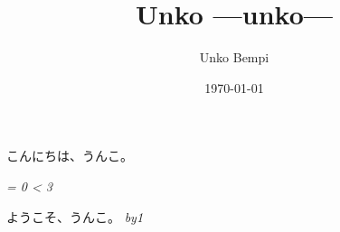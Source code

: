 \documentclass{ltjsarticle}
\author{Unko Bempi}
\date{\today}
\title{Unko ---unko---}
\def\myfor#1{
    \it = 0 \loop\ifnum\it < #1

    ようこそ、うんこ。
    \advance\it by1\repeat
}
\begin{document}
\maketitle
    こんにちは、うんこ。

    \myfor{3}
\end{document}
